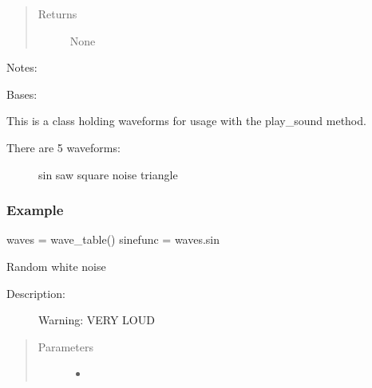 \documentclass[letterpaper,10pt,english]{sphinxmanual}
\begin{document}
\begin{fulllineitems}
\begin{fulllineitems}
\begin{quote}
\begin{description}
\item[{Returns}] \leavevmode
\sphinxAtStartPar
None

\end{description}\end{quote}

\sphinxAtStartPar
Notes:

\end{fulllineitems}


\end{fulllineitems}


\begin{fulllineitems}
\label{\detokenize{dpav:dpav.audio.wave_table}}
\pysigstartsignatures
{}
\pysigstopsignatures
\sphinxAtStartPar
Bases: 

\sphinxAtStartPar
This is a class holding waveforms for usage with the play\_sound method.
\begin{description}
\item[{There are 5 waveforms:}] \leavevmode
\sphinxAtStartPar
sin
saw
square
noise
triangle

\end{description}
\subsubsection*{Example}

\sphinxAtStartPar
waves = wave\_table()
sinefunc = waves.sin

\begin{fulllineitems}
\label{\detokenize{dpav:dpav.audio.wave_table.noise}}
\pysigstartsignatures
{}
\pysigstopsignatures
\sphinxAtStartPar
Random white noise
\begin{description}
\item[{Description:}] \leavevmode
\sphinxAtStartPar
Warning: VERY LOUD

\end{description}
\begin{quote}\begin{description}
\item[{Parameters}] \leavevmode\begin{itemize}
\item {} 
\sphinxAtStartPar
{} \textendash{} 


\end{itemize}
\end{description}
\end{quote}
\end{fulllineitems}
\end{fulllineitems}
\end{document}
